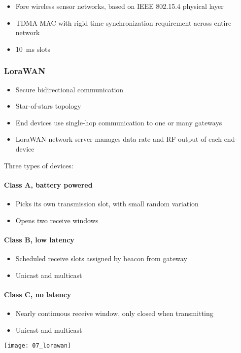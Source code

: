 \begin{itemize}
		\item Fore wireless sensor networks, based on IEEE 802.15.4 physical layer
		\item TDMA MAC with rigid time synchronization requirement across entire network
		\item \SI{10}{ms} slots
\end{itemize}

\subsubsection{LoraWAN}

\begin{itemize}
		\item Secure bidirectional communication
		\item Star-of-stars topology
		\item End devices use single-hop communication to one or many gateways
		\item LoraWAN network server manages data rate and RF output of each end-device
\end{itemize}

Three types of devices:

\paragraph{Class A, battery powered}

\begin{itemize}
		\item Picks its own transmission slot, with small random variation
		\item Opens two receive windows
\end{itemize}

\paragraph{Class B, low latency}

\begin{itemize}
		\item Scheduled receive slots assigned by beacon from gateway
		\item Unicast and multicast
\end{itemize}

\paragraph{Class C, no latency}

\begin{itemize}
		\item Nearly continuous receive window, only closed when transmitting
		\item Unicast and multicast
\end{itemize}

\texttt{[image: 07\_lorawan]}
